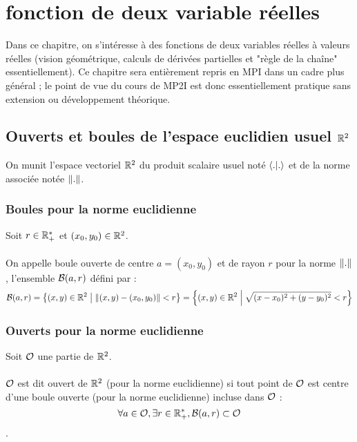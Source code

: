 \chapter{fonction de deux variable réelles}
\minitoc 
Dans ce chapitre, on s’intéresse à des fonctions de deux variables réelles à valeurs réelles (vision géométrique, calculs de dérivées partielles et "règle de la chaîne" essentiellement). Ce chapitre sera entièrement repris en MPI dans un cadre plus général ; le point de vue du cours de MP2I est donc essentiellement pratique sans extension ou développement théorique.
\section{Ouverts et boules de l’espace euclidien usuel \(\R^2\)}
On munit l’espace vectoriel \(\R^2\) du produit scalaire usuel noté \(\scal{.}{.}\) et de la norme associée notée \(\norme{.}\).
\subsection{Boules pour la norme euclidienne}
\begin{defprop}
    Soit \(r \in \Rps\) et \((x_0, y_0) \in \R^2\).\\~\\
    On appelle boule ouverte de centre \(a = (x_0, y_0)\) et de rayon \(r\) pour la norme \(\norme{.}\), l’ensemble \(\cal{B}(a, r)\) défini par :
    \[\cal{B}(a, r) = \accol{(x, y) \in \R^2 \tq \norme{(x, y) - (x_0, y_0)} < r} = \accol{(x, y) \in \R^2 \tq \sqrt{(x - x_0)^2 + (y - y_0)^2} < r}\]
\end{defprop}
\subsection{Ouverts pour la norme euclidienne}
\begin{defprop}
    Soit \(\cal{O}\) une partie de \(\R^2\).\\~\\
    \(\cal{O}\) est dit ouvert de \(\R^2\) (pour la norme euclidienne) si tout point de \(\cal{O}\) est centre d’une boule ouverte (pour la norme euclidienne) incluse dans \(\cal{O}\) :
    \[\forall a \in \cal{O}, \exists r \in \Rps, \cal{B}(a, r) \subset \cal{O}\].
\end{defprop}
